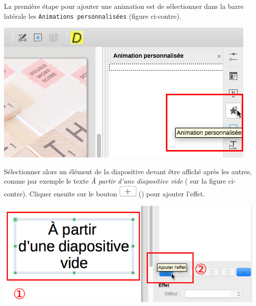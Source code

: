 \begin{minipage}[c]{.58\textwidth}
La première étape pour ajouter une animation est de sélectionner dans la barre latérale les \texttt{Animations personnalisées} (figure ci-contre).
\end{minipage}\hfill%
\begin{minipage}[c]{.38\textwidth}
\centering%
\includegraphics[angle=0,width=\textwidth]{./images/presentation/Impress_08_Transitions_01}
\end{minipage}

\vspace{1em}

\begin{minipage}[c]{.58\textwidth}
Sélectionner alors un élément de la diapositive devant être affiché après les autres, comme par exemple le texte \emph{\og À partir d'une diapositive vide \fg} ( sur la figure ci-contre). Cliquer ensuite sur le bouton \includegraphics[width=.7cm]{./images/presentation/boutonPlus} () pour ajouter l'effet.  
\end{minipage}\hfill%
\begin{minipage}[c]{.38\textwidth}
\centering%
\includegraphics[angle=0,width=\textwidth]{./images/presentation/Impress_08_Transitions_02}
\end{minipage}

